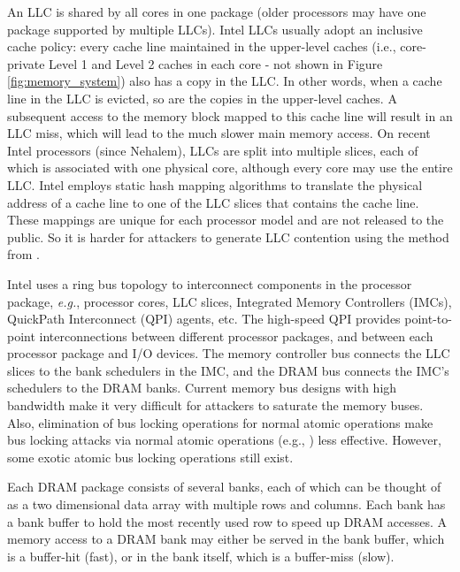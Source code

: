 \documentclass{sig-alternate}
\newcommand{\bheading}[1]{{\vspace{2pt}\noindent{\textbf{#1}}\hspace{2pt}}}
\newcommand{\eg}{\emph{e.g.}\xspace}
\begin{document}
\bheading{Last Level Caches (LLC).}
An LLC is shared by all cores in one package (older processors may have one package supported by multiple LLCs). Intel LLCs usually adopt an inclusive cache policy: every cache line maintained in the upper-level caches (i.e., core-private Level 1 and Level 2 caches in each core - not shown in Figure \ref{fig:memory_system}) also has a copy in the LLC. In other words, when a cache line in the LLC is evicted, so are the copies in the upper-level caches. A subsequent access to the memory block mapped to this cache line will result in an LLC miss, which will lead to the much slower main memory access. On recent Intel processors (since Nehalem), LLCs are split into multiple slices, each of which is associated with one physical core, although every core may use the entire LLC. Intel employs static hash mapping algorithms to translate the physical address of a cache line to one of the LLC slices that contains the cache line. These mappings are unique for each processor model and are not released to the public. So it is harder for attackers to generate LLC contention using the method from \cite{WoLe:07}.



\bheading{Memory Buses.}
Intel uses a ring bus topology to interconnect components in the processor package, 
\eg, processor cores, LLC slices, Integrated Memory Controllers (IMCs), QuickPath 
Interconnect (QPI) agents, etc. The high-speed QPI provides point-to-point 
interconnections between different processor packages, and between each processor 
package and I/O devices. The memory controller bus connects the LLC slices to the 
bank schedulers in the IMC, and the DRAM bus connects the IMC's schedulers to the 
DRAM banks. Current memory bus designs with high bandwidth make it very difficult 
for attackers to saturate the memory buses. Also, elimination of bus locking
operations for normal atomic operations make bus locking attacks via normal atomic 
operations (e.g., \cite{WoLe:07}) less effective. However, some exotic atomic bus
locking operations still exist.

\bheading{DRAM banks.}
Each DRAM package consists of several banks, each of which can be thought of as a two dimensional data array with multiple rows and columns. Each bank has a bank buffer to hold the most recently used row to speed up DRAM accesses. A memory access to a DRAM bank may either be served in the bank buffer, which is a buffer-hit (fast), or in the bank itself, which is a buffer-miss (slow).
\end{document}
